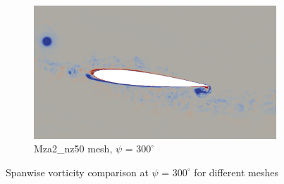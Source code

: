 \begin{figure}[H]
	\begin{subfigure}[b]{0.6\textwidth}
		\centering
		\includegraphics[width=1\textwidth]{figures/zonal_adapt_results/vorticity_plots_Re200k/Mza2_50/phase_300.png}
		\caption{Mza2\_nz50 mesh, $\psi$ = $300^\circ$}
		\label{fig:Mza2_50_Re200k_sp_psi300}
	\end{subfigure}	
	\caption{Spanwise vorticity comparison at $\psi$ = $300^\circ$ for different meshes}
	\label{fig:vorticity_Re200k_sp_300}
\end{figure}

